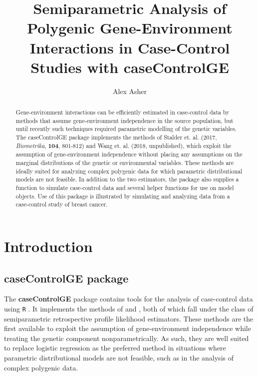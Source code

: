 \documentclass[]{article}
\title{Semiparametric Analysis of Polygenic Gene-Environment Interactions in
Case-Control Studies with caseControlGE}
\author{Alex Asher}
\date{}
\begin{document}
\maketitle
\begin{abstract}
Gene-environment interactions can be efficiently estimated in
case-control data by methods that assume gene-environment independence
in the source population, but until recently such techniques required
parametric modelling of the genetic variables. The caseControlGE package
implements the methods of Stalder et. al. (2017, \emph{Biometrika},
\textbf{104}, 801-812) and Wang et. al. (2018, unpublished), which
exploit the assumption of gene-environment independence without placing
any assumptions on the marginal distributions of the genetic or
environmental variables. These methods are ideally suited for analyzing
complex polygenic data for which parametric distributional models are
not feasible. In addition to the two estimators, the package also
supplies a function to simulate case-control data and several helper
functions for use on model objects. Use of this package is illustrated
by simulating and analyzing data from a case-control study of breast
cancer.
\end{abstract}

{
\setcounter{tocdepth}{2}
\tableofcontents
}
\begin{titlepage}
\end{titlepage}

\def\bbeta{\mbox{\boldmath $\beta$}} \def\pr{\hbox{pr}}
\def\E{{\mathbf E}}

\section{Introduction}

\subsection{caseControlGE package}

The \textbf{caseControlGE} package \citep{Asher2018R} contains tools for
the analysis of case-control data using \texttt{R} \citep{R2018}. It
implements the methods of \citet{Stalder2017} and
\citet{Wang2018unpublished}, both of which fall under the class of
semiparametric retrospective profile likelihood estimators. These
methods are the first available to exploit the assumption of
gene-environment independence while treating the genetic component
nonparametrically. As such, they are well suited to replace logistic
regression as the preferred method in situations where parametric
distributional models are not feasible, such as in the analysis of
complex polygenic data.
\end{document}
